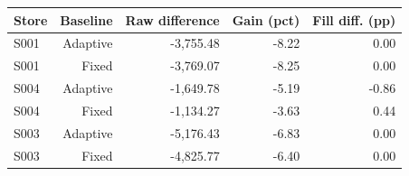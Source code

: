 \begin{tabular}{lrrrr}
\toprule
Store & Baseline & Raw difference & Gain (pct) & Fill diff. (pp) \\
\midrule
S001 & Adaptive & -3,755.48 & -8.22 & 0.00 \\
S001 & Fixed & -3,769.07 & -8.25 & 0.00 \\
S004 & Adaptive & -1,649.78 & -5.19 & -0.86 \\
S004 & Fixed & -1,134.27 & -3.63 & 0.44 \\
S003 & Adaptive & -5,176.43 & -6.83 & 0.00 \\
S003 & Fixed & -4,825.77 & -6.40 & 0.00 \\
\bottomrule
\end{tabular}

